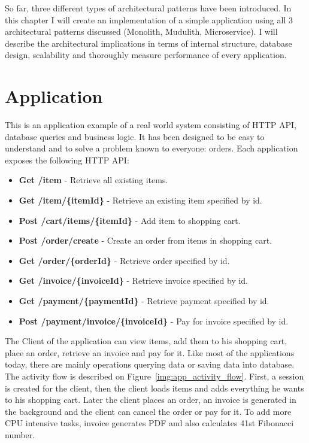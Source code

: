 

So far, three different types of architectural patterns have been introduced. In this chapter I will create an implementation of a simple application using all 3 architectural patterns discussed (Monolith, Mudulith, Microservice). I will describe the architectural implications in terms of internal structure, database design, scalability and thoroughly measure performance of every application.

\section{Application}
This is an application example of a real world system consisting of HTTP API, database queries and business logic. It has been designed to be easy to understand and to solve a problem known to everyone: orders. Each application exposes the following HTTP API:
\begin{itemize}
    \item \textbf{Get /item} - Retrieve all existing items.
    \item \textbf{Get /item/\{itemId\}} - Retrieve an existing item specified by id.
    \item \textbf{Post /cart/items/\{itemId\}} - Add item to shopping cart.
    \item \textbf{Post /order/create} - Create an order from items in shopping cart.
    \item \textbf{Get /order/\{orderId\}} - Retrieve order specified by id.
    \item \textbf{Get /invoice/\{invoiceId\}} - Retrieve invoice specified by id.
    \item \textbf{Get /payment/\{paymentId\}} - Retrieve payment specified by id.
    \item \textbf{Post /payment/invoice/\{invoiceId\}} - Pay for invoice specified by id.
\end{itemize}

The Client of the application can view items, add them to his shopping cart, place an order, retrieve an invoice and pay for it. Like most of the applications today, there are mainly operations querying data or saving data into database. The activity flow is described on Figure~\ref{img:app_activity_flow}. First, a session is created for the client, then the client loads items and adds everything he wants to his shopping cart. Later the client places an order, an invoice is generated in the background and the client can cancel the order or pay for it. To add more CPU intensive tasks, invoice generates PDF and also calculates 41st Fibonacci number.

